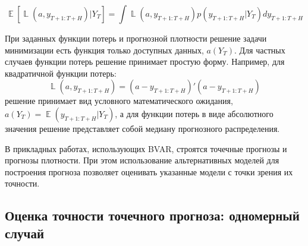 \documentclass[11pt]{article} %
\DeclareMathOperator{\E}{\mathbb{E}}
\DeclareMathOperator{\Loss}{\mathbb{L}}
\DeclareMathOperator{\chol}{chol}
\let\vec\relax
\DeclareMathOperator{\vec}{vec}
\begin{document}
\begin{equation}
\E[\Loss(a,y_{T+1:T+H})|Y_T]=\int \Loss(a, y_{T+1:T+H}) p(y_{T+1:T+H}|Y_T) dy_{T+1:T+H}
\end{equation}

При заданных функции потерь и прогнозной плотности решение задачи минимизации есть функция только доступных данных, $a(Y_T)$. Для частных случаев функции потерь решение принимает простую форму. Например, для квадратичной функции потерь:
\[
\Loss(a,y_{T+1:T+H}) = (a - y_{T+1:T+H})'(a - y_{T+1:T+H})
\]
решение принимает вид условного математического ожидания, $a(Y_T)=\E(y_{T+1:T+H}|Y_T)$, а для функции потерь в виде абсолютного значения решение представляет собой медиану прогнозного распределения.

В прикладных работах, использующих BVAR,  строятся точечные прогнозы и прогнозы плотности.  При этом использование альтернативных моделей для построения прогноза позволяет оценивать указанные модели с точки зрения их точности.

\subsection{Оценка точности точечного прогноза: одномерный случай}
\end{document}
